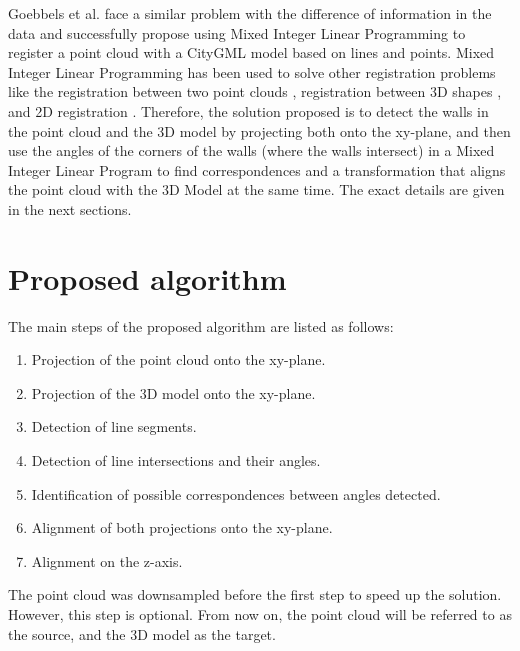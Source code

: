         Goebbels et al. \cite{Goebbels_2018_linebased, Goebbels_2018_alinear} face a similar problem with the difference of information in the data 
        and successfully propose using Mixed Integer Linear Programming to register a point cloud with a CityGML model based on lines and points.
        Mixed Integer Linear Programming has been used to solve other registration problems
        like the registration between two point clouds \cite{Sakakubara_2007_automatic},
        registration between 3D shapes \cite{Windheuser_2011_largescale},
        and 2D registration \cite{Bazin_2013_abranchandbound}.
        Therefore, the solution proposed is to detect the walls in the point cloud and the 3D model by projecting both onto the xy-plane,  
        and then use the angles of the corners of the walls (where the walls intersect)
        in a Mixed Integer Linear Program to find correspondences and a transformation that aligns the point cloud with the 3D Model at the same time.
        The exact details are given in the next sections.
     
    \section{Proposed algorithm}
        The main steps of the proposed algorithm are listed as follows:
        \begin{enumerate}[nosep]
            \item Projection of the point cloud onto the xy-plane.
            \item Projection of the 3D model onto the xy-plane.
            \item Detection of line segments.
            \item Detection of line intersections and their angles.
            \item Identification of possible correspondences between angles detected.
            \item Alignment of both projections onto the xy-plane.
            \item Alignment on the z-axis.
        \end{enumerate}

        The point cloud was downsampled before the first step to speed up the solution. However, this step is optional.
        From now on, the point cloud will be referred to as the source, and the 3D model as the target.

